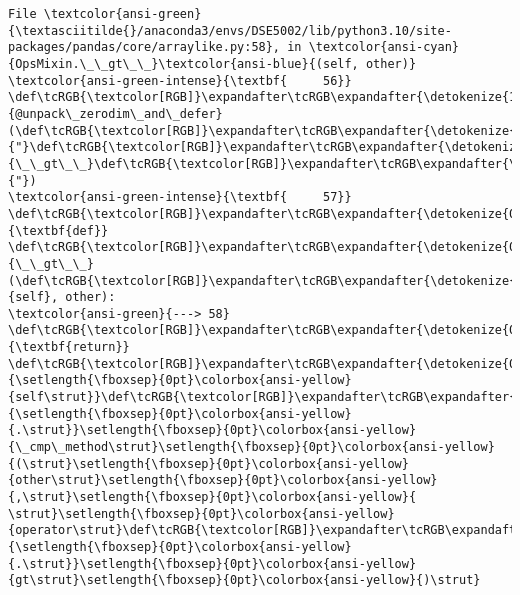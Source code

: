 \documentclass[11pt]{article}
\begin{document}
\begin{Verbatim}[commandchars=\\\{\}, frame=single, framerule=2mm, rulecolor=\color{outerrorbackground}]
File \textcolor{ansi-green}{\textasciitilde{}/anaconda3/envs/DSE5002/lib/python3.10/site-packages/pandas/core/arraylike.py:58}, in \textcolor{ansi-cyan}{OpsMixin.\_\_gt\_\_}\textcolor{ansi-blue}{(self, other)}
\textcolor{ansi-green-intense}{\textbf{     56}} \def\tcRGB{\textcolor[RGB]}\expandafter\tcRGB\expandafter{\detokenize{175,0,255}}{@unpack\_zerodim\_and\_defer}(\def\tcRGB{\textcolor[RGB]}\expandafter\tcRGB\expandafter{\detokenize{175,0,0}}{"}\def\tcRGB{\textcolor[RGB]}\expandafter\tcRGB\expandafter{\detokenize{175,0,0}}{\_\_gt\_\_}\def\tcRGB{\textcolor[RGB]}\expandafter\tcRGB\expandafter{\detokenize{175,0,0}}{"})
\textcolor{ansi-green-intense}{\textbf{     57}} \def\tcRGB{\textcolor[RGB]}\expandafter\tcRGB\expandafter{\detokenize{0,135,0}}{\textbf{def}} \def\tcRGB{\textcolor[RGB]}\expandafter\tcRGB\expandafter{\detokenize{0,0,255}}{\_\_gt\_\_}(\def\tcRGB{\textcolor[RGB]}\expandafter\tcRGB\expandafter{\detokenize{0,135,0}}{self}, other):
\textcolor{ansi-green}{---> 58}     \def\tcRGB{\textcolor[RGB]}\expandafter\tcRGB\expandafter{\detokenize{0,135,0}}{\textbf{return}} \def\tcRGB{\textcolor[RGB]}\expandafter\tcRGB\expandafter{\detokenize{0,135,0}}{\setlength{\fboxsep}{0pt}\colorbox{ansi-yellow}{self\strut}}\def\tcRGB{\textcolor[RGB]}\expandafter\tcRGB\expandafter{\detokenize{98,98,98}}{\setlength{\fboxsep}{0pt}\colorbox{ansi-yellow}{.\strut}}\setlength{\fboxsep}{0pt}\colorbox{ansi-yellow}{\_cmp\_method\strut}\setlength{\fboxsep}{0pt}\colorbox{ansi-yellow}{(\strut}\setlength{\fboxsep}{0pt}\colorbox{ansi-yellow}{other\strut}\setlength{\fboxsep}{0pt}\colorbox{ansi-yellow}{,\strut}\setlength{\fboxsep}{0pt}\colorbox{ansi-yellow}{ \strut}\setlength{\fboxsep}{0pt}\colorbox{ansi-yellow}{operator\strut}\def\tcRGB{\textcolor[RGB]}\expandafter\tcRGB\expandafter{\detokenize{98,98,98}}{\setlength{\fboxsep}{0pt}\colorbox{ansi-yellow}{.\strut}}\setlength{\fboxsep}{0pt}\colorbox{ansi-yellow}{gt\strut}\setlength{\fboxsep}{0pt}\colorbox{ansi-yellow}{)\strut}


\end{Verbatim}
\end{document}
